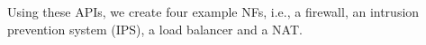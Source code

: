 \begin{comment}
\begin{algorithm}[!t]
\SetKwProg{Proc}{Procedure}{}{}
\Proc{load\_balancer.process\_pkt(input\_pkt, fs, ss)}{
  \If{fs.server = NULL}{
    {fs.server $\leftarrow$ get\_idlest\_server(ss.server\_list)}\;
    {increase\_workload\_counter(ss.workload\_list, fs.server)}\;
  }
  {send\_packet\_to\_server(input\_pkt, fs.server)}\;
}

\Proc{load\_balancer.flow\_expires(fs, ss)}{
  \If{fs.server $\neq$ NULL}{
    {decrease\_workload\_counter(ss.workload\_list, fs.server)}\;
  }
}

\Proc{load\_balancer.flow\_migrate\_out(fs, ss)}{
  \If{fs.server $\neq$ NULL}{
    {decrease\_workload\_counter(ss.workload\_list, fs.server)}\;
  }
}

\Proc{load\_balancer.flow\_migrate\_in(fs, ss)}{
  \If{fs.server $\neq$ NULL}{
    {decrease\_workload\_counter(ss.workload\_list, fs.server)}\;
  }
}

\Proc{load\_balancer.flow\_recover(fs, ss)}{
  \If{fs.server $\neq$ NULL}{
    {increase\_workload\_counter(ss.workload\_list, fs.server)}\;
  }
}

\Proc{nat.process\_pkt(input\_pkt, fs, ss)}{
  \If{fs.state = no\_nat\_addr}{
    {fs.nat\_addr $\leftarrow$ allocate\_nat\_addr(ss.addr\_pool)}\;
    {fs.forward\_5\_tuple $\leftarrow$ get\_5\_tuple(input\_pkt)}\;
    {fs.reverse\_nat\_addr $\leftarrow$ get\_reverse\_nat\_addr(input\_pkt)}\;
    {fs.reverse\_5\_tuple $\leftarrow$ get\_reverse\_5\_tuple(input\_pkt, fs.nat\_addr)}\;
    {notify runtime to forward the flow matching fs.reverse\_5\_tuple to the current flow actor}\;
  }
  \If{fs.state = have\_nat\_addr}{
    \If{match\_5\_tuple(input\_pkt, fs.forward\_5\_tuple)}{
      {update\_pkt\_header(input\_pkt, fs.nat\_addr)}\;
    }
    \If{match\_5\_tuple(input\_pkt, fs.reverse\_5\_tuple)}{
      {update\_pkt\_header(input\_pkt, fs.reverse\_nat\_addr)}\;
    }
    {send\_pkt\_out(input\_pkt)}\;
  }
}

\Proc{nat.flow\_expires(fs, ss)}{
  \If{fs.state = have\_nat\_addr}{
    {deallocate\_nat\_addr(ss.addr\_pool, fs.nat\_addr)}\;
  }
}

\caption{Pseudocode implementation of the APIs for load balancer and NAT}
\label{algo}
\vspace{-1mm}
\end{algorithm}
\end{comment}

Using these APIs, we create four example NFs, i.e., a firewall, an intrusion prevention system (IPS), a load balancer and a NAT.

